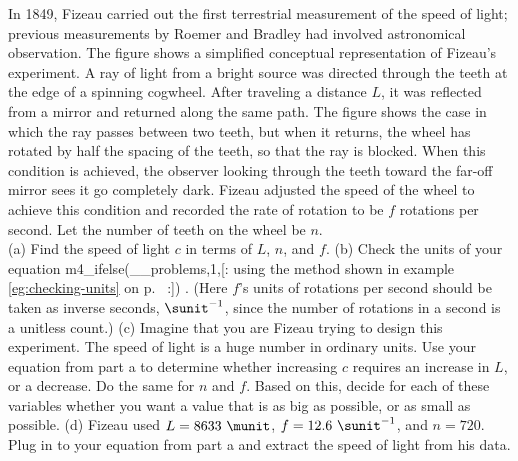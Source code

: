 In 1849, Fizeau carried out the first terrestrial measurement of the speed of light;
previous measurements by Roemer and Bradley had involved astronomical observation.
The figure shows a simplified conceptual representation of Fizeau's experiment.
A ray of light from a bright source was directed through the teeth at the edge of
a spinning cogwheel. After traveling a distance $L$, it was reflected from a mirror
and returned along the same path. The figure shows the case in which the ray passes
between two teeth, but when it returns, the wheel has rotated by half the spacing
of the teeth, so that the ray is blocked. When this condition is achieved, the
observer looking through the teeth toward the far-off mirror sees it go completely
dark. Fizeau adjusted the speed of the wheel to achieve this condition and recorded
the rate of rotation to be $f$ rotations per second. Let the number of teeth on the
wheel be $n$.\\
(a) Find the speed of light $c$ in terms of $L$, $n$, and $f$.\answercheck\hwendpart
(b) Check the units of your equation 
m4_ifelse(__problems,1,[:%
using the method shown in example \ref{eg:checking-units}
on p.~\pageref{eg:checking-units}%
:])%
. (Here $f$'s units of rotations per second should be
taken as inverse seconds, $\sunit^{-1}$, since the number of rotations in a second is
a unitless count.)\hwendpart
(c) Imagine that you are Fizeau trying to design this experiment. The speed of light is
a huge number in ordinary units. Use your equation from part a to determine whether
increasing $c$ requires an increase in $L$, or a decrease. Do the same for $n$ and $f$.
Based on this, decide for each of these variables whether you want a value that is as
big as possible, or as small as possible.\hwendpart
(d) Fizeau used $L=8633\ \munit$, $f=12.6\ \sunit^{-1}$, and $n=720$. Plug in to your
equation from part a and extract the speed of light from his data.\answercheck\hwendpart
